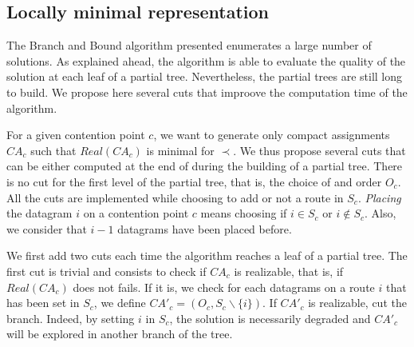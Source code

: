 \subsection{Locally minimal representation}
\begin{comment}
On voudrait énumérer uniquement les solutions qui sont minimales pour 
$\prec$ pour un sommet donné et canoniques, ce qu'on appelle des solutions locally minimal.

On propose un ensemble de coupes faciles à calculer qui permettent d'éliminer la plupart des solutions 
non minimales. Proposer une caractérisation des solutions localement minimales (à vérifier).

Montrer avec des expériences (nombre de représentation générées et pourcentage de minimales en fonction du nombre de routes) que ces coupes sont très efficace, elles permettent de générer uniquement des représentations compactes canoniques valides, et presque aucunes dont la réalisation n'est pas minimale.
\end{comment}
The Branch and Bound algorithm presented enumerates a large number of solutions. As explained ahead, the algorithm is able to evaluate the quality of the solution at each leaf of a partial tree. Nevertheless, the partial trees are still long to build. We propose here several cuts that improove the computation time of the algorithm.

For a given contention point $c$, we want to generate only compact assignments $CA_c$ such that $Real(CA_c)$ is minimal for $\prec$. We thus propose several cuts that can be either computed at the end of during the building of a partial tree. There is no cut for the first level of the partial tree, that is, the choice of and order $O_c$. All the cuts are implemented while choosing to add or not a route in $S_c$. \textit{Placing} the datagram $i$ on a contention point $c$ means choosing if $i\in S_c$ or $i\notin S_c$. Also, we consider that $i-1$ datagrams have been placed before.


We first add two cuts each time the algorithm reaches a leaf of a partial tree.
The first cut is trivial and consists to check if $CA_c$ is realizable, that is, if $Real(CA_c)$ does not fails.
If it is, we check for each datagrams on a route $i$ that has been set in $S_{c}$, we define $CA'_c = (O_c,S_c\backslash\{i\})$. If $CA'_c$ is realizable, cut the branch. Indeed, by setting $i$ in $S_c$, the solution is necessarily degraded and $CA'_c$ will be explored in another branch of the tree.


